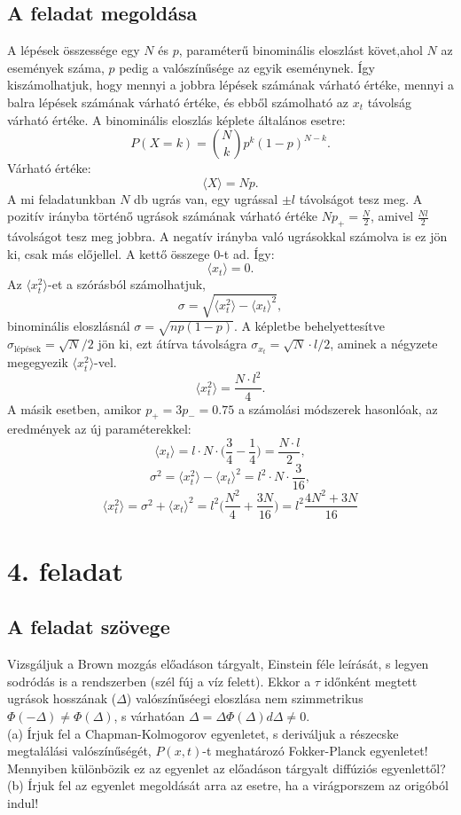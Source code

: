 \documentclass[12pt]{article}
\begin{document}
\subsection*{A feladat megoldása}
A lépések összessége egy $N$ és $p$, paraméterű binominális eloszlást követ,ahol $N$ az események száma, $p$ pedig a valószínűsége az egyik eseménynek. Így kiszámolhatjuk, hogy mennyi a jobbra lépések számának várható értéke, mennyi a balra lépések számának várható értéke, és ebből számolható az $x_t$ távolság várható értéke. A binominális eloszlás képlete általános esetre:
$$P(X = k) = {{N}\choose{k}}p^k(1-p)^{N-k}.$$
Várható értéke:
$$ \langle X \rangle = Np .$$
A mi feladatunkban $N$ db ugrás van, egy ugrással $\pm l$ távolságot tesz meg. A pozitív irányba történő ugrások számának várható értéke $Np_+ = \frac{N}{2}$, amivel $\frac{Nl}{2}$ távolságot tesz meg jobbra. A negatív irányba való ugrásokkal számolva is ez jön ki, csak más előjellel. A kettő összege $0$-t ad. Így:
$$\langle x_t \rangle = 0. $$
Az $\langle x^2_t \rangle $-et a szórásból számolhatjuk,
$$ \sigma = \sqrt{\langle x^2_t \rangle-\langle x_t \rangle ^2},$$ binominális eloszlásnál $\sigma = \sqrt{np(1-p)}$. A képletbe behelyettesítve $\sigma_{\text{lépések}} = \sqrt{N}/2$ jön ki, ezt átírva távolságra $\sigma_{x_t} = \sqrt{N}\cdot l /2$, aminek a négyzete megegyezik $\langle x^2_t \rangle $-vel.
$$\langle x^2_t \rangle = \frac{N\cdot l^2}{4}.$$
A másik esetben, amikor $p_+=3p_-=0.75$ a számolási módszerek hasonlóak, az eredmények az új paraméterekkel:
$$\langle x_t \rangle = l\cdot N\cdot \Big(\frac{3}{4}-\frac{1}{4}\Big ) = \frac{N\cdot l}{2},$$
$$\sigma^2 = {\langle x^2_t \rangle-\langle x_t \rangle ^2} = l^2\cdot N\cdot \frac{3}{16},$$
$$\langle x^2_t \rangle = \sigma^2 + \langle x_t \rangle ^2  = l^2\Big ( \frac{N^2}{4} + \frac{3N}{16} \Big ) = l^2\frac{4N^2 + 3N}{16}$$
\newpage
\section*{4. feladat}
\subsection*{A feladat szövege}
Vizsgáljuk a Brown mozgás előadáson tárgyalt, Einstein féle leírását, s legyen sodródás is a rendszerben (szél fúj a víz felett). Ekkor a $\tau$ időnként megtett ugrások hosszának ($\Delta$) valószínűséegi eloszlása nem szimmetrikus $\Phi(-\Delta) \neq \Phi(\Delta)$, s várhatóan $\Delta =   \Delta\Phi(\Delta)d\Delta\neq 0$.\\
(a) Írjuk fel a Chapman-Kolmogorov egyenletet, s deriváljuk a részecske megtalálási valószínűségét, $P (x, t)$-t meghatározó Fokker-Planck egyenletet! Mennyiben különbözik ez az egyenlet az előadáson tárgyalt diffúziós egyenlettől?
\\
(b) Írjuk fel az egyenlet megoldását arra az esetre, ha a virágporszem az origóból indul!
\end{document}
